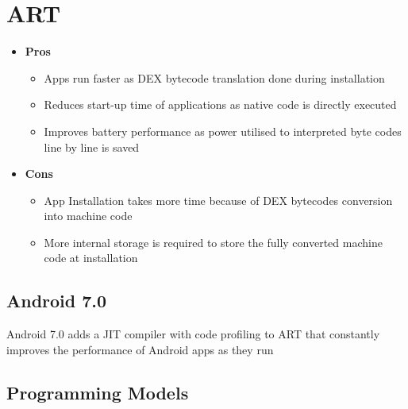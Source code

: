 \documentclass{article}
\begin{document}
\pagebreak

\section{ART}

\begin{itemize}
  \item \textbf{Pros}
  \begin{itemize}
    \item Apps run faster as DEX bytecode translation done during installation
    \item Reduces start-up time of applications as native code is directly executed
    \item Improves battery performance as power utilised to interpreted byte codes line by line is saved
  \end{itemize}
  \item \textbf{Cons}
  \begin{itemize}
    \item App Installation takes more time because of DEX bytecodes conversion into machine code
    \item More internal storage is required to store the fully converted machine code at installation
  \end{itemize}
\end{itemize}

\subsection{Android 7.0}
\begin{flushleft}
Android 7.0 adds a JIT compiler with code profiling to ART that constantly improves the performance of Android apps as they run
\end{flushleft}

\subsection{Programming Models}
\end{document}
